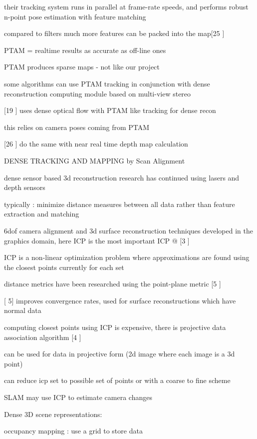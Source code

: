 their tracking system runs in parallel at frame-rate speeds, and performs robust n-point pose estimation with feature matching

compared to filters much more features can be packed into the map[25 \cite{Strasdat10Real} ]

PTAM = realtime results as accurate as off-line ones

PTAM produces sparse maps - not like our project

some algorithms can use PTAM tracking in conjunction with dense reconstruction computing module based on multi-view stereo

[19 \cite{Newcombe10Live}] uses dense optical flow with PTAM like tracking for dense recon

this relies on camera poses coming from PTAM

[26 \cite{Stuhmer10Real}] do the same with near real time depth map calculation

DENSE TRACKING AND MAPPING by Scan Alignment

dense sensor based 3d reconstruction research has continued using lasers and depth sensors

typically : minimize distance measures between all data rather than feature extraction and matching

6dof camera alignment and 3d surface reconstruction techniques developed in the graphics domain, here ICP is the most important
ICP @ [3 \cite{Besl92Method} ]

ICP is a non-linear optimization problem where approximations are found using the closest points currently for each
set

distance metrics have been researched using the point-plane metric [5 \cite{Chen92Object}]

[\cite{Chen92Object} 5] improves convergence rates, used for surface reconstructions which have normal data

computing closest points using ICP is expensive, there is projective data association algorithm [4 \cite{Blais95Registering}]

can be used for data in projective form (2d image where each image is a 3d point)

can reduce icp set to possible set of points or with a coarse to fine scheme

SLAM may use ICP to estimate camera changes

Dense 3D scene representations:

occupancy mapping : use a grid to store data

